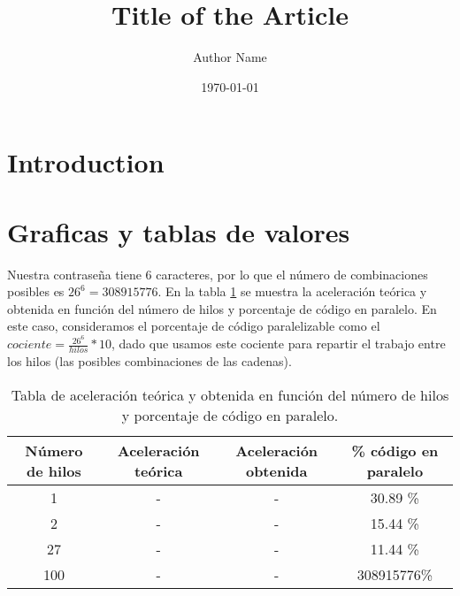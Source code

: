 \documentclass{article}
\title{Title of the Article}
\author{Author Name}
\date{\today}
\begin{document}
\maketitle
\section{Introduction}


\section{Graficas y tablas de valores}

Nuestra contraseña tiene 6 caracteres, por lo que el número de combinaciones posibles es $26^6 = 308 915 776$. En la tabla \ref{tab:my_label} se muestra la aceleración teórica y obtenida en función del número de hilos y porcentaje de código en paralelo.
En este caso, consideramos el porcentaje de código paralelizable como el $cociente=\frac{26^6}{hilos}*10$, dado que usamos este cociente para repartir el trabajo entre los hilos (las posibles combinaciones de las cadenas).

\begin{table}[h]
\centering
\begin{tabular}{|c|c|c|c|}
\hline
\textbf{Número de hilos} & \textbf{Aceleración teórica} & \textbf{Aceleración obtenida} & \textbf{\% código en paralelo} \\
\hline
1 & - & - & 30.89 \% \\
2 & - & - & 15.44 \% \\
27 & - & - & 11.44 \% \\
100 & - & - & 308915776\% \\
\hline
\end{tabular}
\caption{Tabla de aceleración teórica y obtenida en función del número de hilos y porcentaje de código en paralelo.}
\label{tab:my_label}
\end{table}
\end{document}
